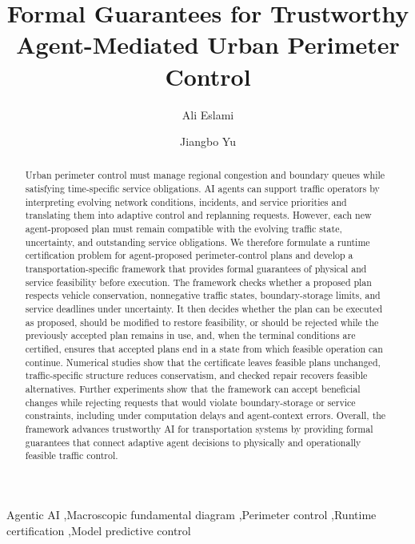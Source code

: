 \documentclass[preprint,12pt]{elsarticle}
\begin{document}
\begin{frontmatter}
\title{Formal Guarantees for Trustworthy Agent-Mediated Urban Perimeter Control}
\author[mcgill]{Ali Eslami}
\author[mcgill]{Jiangbo Yu}
\begin{abstract}\fontsize{11}{13}\selectfont
Urban perimeter control must manage regional congestion and boundary queues
while satisfying time-specific service obligations. AI agents can support
traffic operators by interpreting evolving network conditions, incidents,
and service priorities and translating them into adaptive control and
replanning requests. However, each new agent-proposed plan must remain
compatible with the evolving traffic state, uncertainty, and outstanding
service obligations. We therefore formulate a runtime certification problem
for agent-proposed perimeter-control plans and develop a
transportation-specific framework that provides formal guarantees of
physical and service feasibility before execution. The framework checks
whether a proposed plan respects vehicle conservation, nonnegative traffic
states, boundary-storage limits, and service deadlines under uncertainty. It
then decides whether the plan can be executed as proposed, should be
modified to restore feasibility, or should be rejected while the previously
accepted plan remains in use, and, when the terminal conditions are
certified, ensures that accepted plans end in a state from which feasible
operation can continue. Numerical studies show that the certificate leaves
feasible plans unchanged, traffic-specific structure reduces conservatism,
and checked repair recovers feasible alternatives. Further experiments show
that the framework can accept beneficial changes while rejecting requests
that would violate boundary-storage or service constraints, including under
computation delays and agent-context errors. Overall, the framework advances
trustworthy AI for transportation systems by providing formal guarantees
that connect adaptive agent decisions to physically and operationally
feasible traffic control.
\end{abstract}
\begin{keyword}
Agentic AI \sep Macroscopic fundamental diagram \sep Perimeter control \sep Runtime certification \sep Model predictive control
\end{keyword}
\end{frontmatter}
\end{document}
